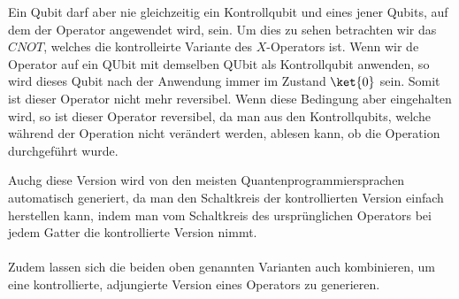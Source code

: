 Ein Qubit darf aber nie gleichzeitig ein Kontrollqubit und eines jener Qubits, auf dem der Operator angewendet wird, sein. Um dies zu sehen betrachten wir das $CNOT$, welches die kontrolleirte Variante des $X$-Operators ist. Wenn wir de Operator auf ein QUbit mit demselben QUbit als Kontrollqubit anwenden, so wird dieses Qubit nach der Anwendung immer im Zustand $\ket{0}$ sein. Somit ist dieser Operator nicht mehr reversibel. Wenn diese Bedingung aber eingehalten wird, so ist dieser Operator reversibel, da man aus den Kontrollqubits, welche während der Operation nicht verändert werden, ablesen kann, ob die Operation durchgeführt wurde.

Auchg diese Version wird von den meisten Quantenprogrammiersprachen automatisch generiert, da man den Schaltkreis der kontrollierten Version einfach herstellen kann, indem man vom Schaltkreis des ursprünglichen Operators bei jedem Gatter die kontrollierte Version nimmt.

\paragraph{}

Zudem lassen sich die beiden oben genannten Varianten auch kombinieren, um eine kontrollierte, adjungierte Version eines Operators zu generieren. 